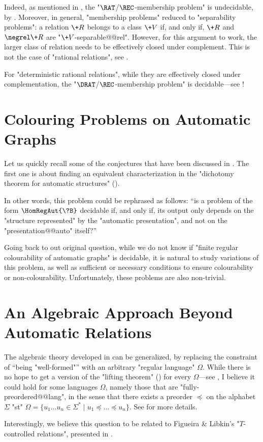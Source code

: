 Indeed, as mentioned in ,
the "$\RAT$/$\REC$-membership problem" is undecidable, by
\cite[\S~III, Theorem~8.4]{Berstel1979Transductions}.
Moreover, in general, "membership problems" reduced to "separability problems":
a relation $\+R$ belongs to a class $\+V$ if, and only if, $\+R$ and $\negrel \+R$
are "$\+V$-separable@@rel". However, for this argument to work, the larger class of relation
needs to be effectively closed under complement.
This is not the case of "rational relations", see .

For "deterministic rational relations", while they are effectively
closed under complementation, the "$\DRAT$/$\REC$-membership problem"
is decidable---see !

\section{Colouring Problems on Automatic Graphs}

Let us quickly recall some of the conjectures that have been discussed in .
The first one is about finding an equivalent characterization in the "dichotomy theorem
for automatic structures" ().

\conjInvarianceGraphIsomorphisms*

In other words, this problem could be rephrased as follows: ``is a problem
of the form $\HomRegAut{\?B}$ decidable if, and only if, its output
only depends on the "structure represented" by the "automatic presentation",
and not on the "presentation@@auto" itself?''

Going back to out original question,
while we do not know if "finite regular colourability of automatic graphs"
is decidable, it is natural to study variations of this problem, as well as
sufficient or necessary conditions to ensure colourability or non-colourability.
Unfortunately, these problems are also non-trivial.

\conjFiniteColourabilityUndecidable*

\conjUnboundedCliques*

\section{An Algebraic Approach Beyond Automatic Relations}

The algebraic theory developed in  can be generalized,
by replacing the constraint of ``being "well-formed"'' with an arbitrary
"regular language" $\Omega$.
While there is no hope to get a version of the
"lifting theorem" () for every $\Omega$---see , I believe it could hold for some languages $\Omega$,
namely those that are "fully-preordered@@lang",
in the sense that there exists a preorder $\preccurlyeq$ on the alphabet $\Sigma$
"st" $\Omega = \{u_1 \dotsc u_n \in \Sigma^* \mid u_1 \preccurlyeq \dotsc \preccurlyeq u_n\}$.
See  for more details.

Interestingly, we believe this question to be related to Figueira \& Libkin's
"$T$-controlled relations", presented in
.
